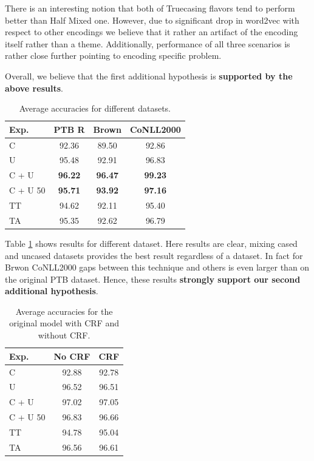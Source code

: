 \documentclass[11pt,a4paper]{article}
\begin{document}
    There is an interesting notion that both of Truecasing flavors tend to perform better than Half Mixed one. However, due to significant drop in word2vec with respect to other encodings we believe that it rather an artifact of the encoding itself rather than a theme. Additionally, performance of all three scenarios is rather close further pointing to encoding specific problem.

    Overall, we believe that the first additional hypothesis is \textbf{supported by the above results}.

    \begin{table}[h]
        \centering
        \begin{tabular}{|l|c|c|c|}
            \hline
            Exp. & PTB R & Brown & CoNLL2000 \\
            \hline
            C        & 92.36          & 89.50          & 92.86\\
            U        & 95.48          & 92.91          & 96.83 \\
            C + U    & \textbf{96.22} & \textbf{96.47} & \textbf{99.23} \\
            C + U 50 & \textbf{95.71} & \textbf{93.92} & \textbf{97.16} \\
            TT       & 94.62          & 92.11          & 95.40 \\
            TA       & 95.35          & 92.62          & 96.79 \\
            \hline
        \end{tabular}
        \caption{Average accuracies for different datasets.}
        \label{tab:epos-results-datasets}
    \end{table}

    Table \ref{tab:epos-results-datasets} shows results for different dataset. Here results are clear, mixing cased and uncased datasets provides the best result regardless of a dataset. In fact for Brwon CoNLL2000 gaps between this technique and others is even larger than on the original PTB dataset. Hence, these results \textbf{strongly support our second additional hypothesis}.

    \begin{table}[h]
        \centering
        \begin{tabular}{|l|c|c|}
            \hline
            Exp. & No CRF & CRF \\
            \hline
            C        & 92.88 & 92.78 \\
            U        & 96.52 & 96.51 \\
            C + U    & 97.02 & 97.05 \\
            C + U 50 & 96.83 & 96.66 \\
            TT       & 94.78 & 95.04 \\
            TA       & 96.56 & 96.61 \\
            \hline
        \end{tabular}
        \caption{Average accuracies for the original model with CRF and without CRF.}
        \label{tab:epos-results-crf}
    \end{table}
\end{document}
